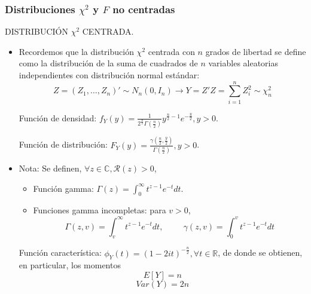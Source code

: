 \documentclass[11pt,a4paper]{article}
\begin{document}
\subsubsection{Distribuciones \texorpdfstring{$\chi^{2}$}) y \texorpdfstring{$F$}) no centradas}
DISTRIBUCIÓN $\chi^{2}$ CENTRADA.
\begin{itemize}
\item Recordemos que la distribución $\chi^{2}$ centrada con $n$ grados de libertad se define como la distribución de la suma de cuadrados de $n$ variables aleatorias independientes con distribución normal estándar:
$$Z = (Z_{1}, \dots, Z_{n})' \sim N_{n}(0, I_{n}) \rightarrow Y = Z'Z = \sum_{i=1}^{n} Z_{i}^{2} \sim \chi_{n}^{2}$$

Función de densidad: $f_{Y}(y) = \frac{1}{2^{\frac{n}{2}}\Gamma(\frac{n}{2})}y^{\frac{n}{2}-1}e^{-\frac{y}{2}}, y > 0$.

Función de distribución: $F_{Y}(y) = \frac{\gamma(\frac{n}{2}, \frac{y}{2})}{\Gamma(\frac{n}{2})}, y > 0$.

\item Nota: Se definen, $\forall z \in \mathbb{C}, \mathcal{R}(z) > 0$,
\begin{itemize}
\item Función gamma: $\Gamma(z) = \int_{0}^{\infty} t^{z-1}e^{-t} dt$.
\item Funciones gamma incompletas: para $v > 0$,
$$\Gamma(z, v) = \int_{v}^{\infty} t^{z-1}e^{-t}dt, \hspace{1cm} \gamma(z, v) = \int_{0}^{v} t^{z-1}e^{-t}dt$$
\end{itemize}

Función característica: $\phi_{Y}(t) = (1 - 2it)^{-\frac{n}{2}}, \forall t \in \mathbb{R}$, de donde se obtienen, en particular, los momentos
$$E[Y] = n$$
$$Var(Y) = 2n$$
\end{itemize}
\end{document}
